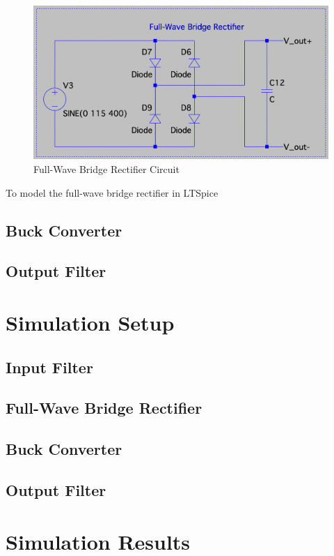 \documentclass[conference]{IEEEtran}
\begin{document}
\begin{figure}[htp]
    \centering
    \includegraphics[width=1.0\linewidth]{full-wave_bridge_rectifier_circuit.png}
    \caption{Full-Wave Bridge Rectifier Circuit}
    \label{fig:full-wave_bridge_rectifier_circuit_diagram}
\end{figure}

To model the full-wave bridge rectifier in LTSpice

\subsection{Buck Converter}


\subsection{Output Filter}

\section{Simulation Setup}
\subsection{Input Filter}
\subsection{Full-Wave Bridge Rectifier}
\subsection{Buck Converter}
\subsection{Output Filter}


\section{Simulation Results}
\end{document}
